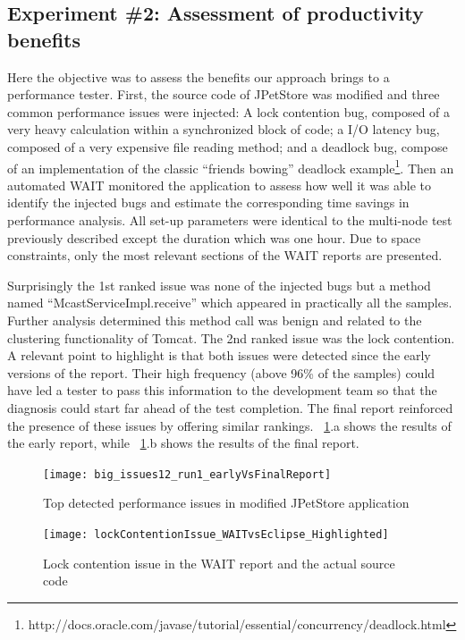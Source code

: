 \documentclass[runningheads,a4paper]{llncs}
\begin{document}
\vspace{-7pt}
\subsection{Experiment \#2: Assessment of productivity benefits}
\label{Experiment_2_Results}
\vspace{-7pt}

Here the objective was to assess the benefits our approach brings to a
performance tester. First, the source code of JPetStore was modified and three
common performance issues were injected: A lock contention bug, composed of a
very heavy calculation within a synchronized block of code; a I/O latency bug, 
composed of a very expensive file reading method; and a deadlock bug, compose
of an implementation of the classic ``friends bowing'' deadlock
example\footnote{http://docs.oracle.com/javase/tutorial/essential/concurrency/deadlock.html}.
Then an automated WAIT monitored the application to assess how well
it was able to identify the injected bugs and estimate the corresponding time
savings in performance analysis. All set-up parameters were identical to
the multi-node test previously described except the duration which
was one hour. Due to space constraints, only the most relevant sections
of the WAIT reports are presented.

Surprisingly the 1st ranked issue was none of the injected bugs but a method
named ``McastServiceImpl.receive'' which appeared in practically all the
samples. Further analysis determined this method call was benign and related
to the clustering functionality of Tomcat. The 2nd ranked issue was the lock
contention. A relevant point to highlight is that both issues were detected
since the early versions of the report. Their high frequency (above
96\% of the samples) could have led a tester to pass this
information to the development team so that the diagnosis could start far ahead
of the test completion. The final report reinforced the presence of these issues 
by offering similar rankings. \figurename ~\ref{fig_run1_bugs12}.a shows the
results of the early report, while ~\ref{fig_run1_bugs12}.b shows the results of 
the final report.

\begin{figure}[!h]
\centering
\texttt{[image: big\_issues12\_run1\_earlyVsFinalReport]}
\caption{Top detected performance issues in modified JPetStore application}
\label{fig_run1_bugs12}
\end{figure}

\begin{figure}[!h]
\centering
\texttt{[image: lockContentionIssue\_WAITvsEclipse\_Highlighted]}
\caption{Lock contention issue in the WAIT report and the actual source code}
\label{fig_issue2_vs_code}
\end{figure}
\end{document}
